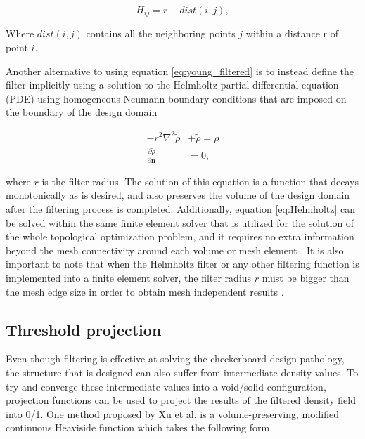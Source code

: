 \documentclass[../main.tex]{subfiles}
\begin{document}
\begin{equation}
  H_{ij} = r -  dist(i, j),
\end{equation}

Where $dist(i,j)$ contains all the neighboring points $j$ within a distance r of point $i$.

Another alternative to using equation \ref{eq:young_filtered} is to instead define the filter implicitly using a solution to the Helmholtz partial differential equation (PDE) using homogeneous Neumann boundary conditions that are imposed on the boundary of the design domain \cite{lazarovFiltersTopologyOptimization2011}

\begin{align}
  -r^2 \nabla ^2 \tilde{\rho} &+ \tilde{\rho} = \rho \label{eq:Helmholtz}\\ 
 \frac{\partial{\tilde{\rho}}}{\partial {\bm{n}}} &= 0 \nonumber,
\end{align}

where $r$ is the filter radius. The solution of this equation is a function that decays monotonically as is desired, and also preserves the volume of the design domain after the filtering process is completed. Additionally, equation \ref{eq:Helmholtz} can be solved within the same finite element solver that is utilized for the solution of the whole topological optimization problem, and it requires no extra information beyond the mesh connectivity around each volume or mesh element \cite{lambeTopologyOptimizationUsing2018}. It is also important to note that when the Helmholtz filter or any other filtering function is implemented into a finite element solver, the filter radius $r$ must be bigger than the mesh edge size in order to obtain mesh independent results \cite{PerformingTopologyOptimization}.

\subsection{Threshold projection}

Even though filtering is effective at solving the checkerboard design pathology, the structure that is designed can also suffer from intermediate density values. To try and converge these intermediate values into a void/solid configuration, projection functions can be used to project the results of the filtered density field into 0/1. One method proposed by Xu et al. \cite{xuVolumePreservingNonlinear2010} is a volume-preserving, modified continuous Heaviside function which takes the following form
\end{document}
